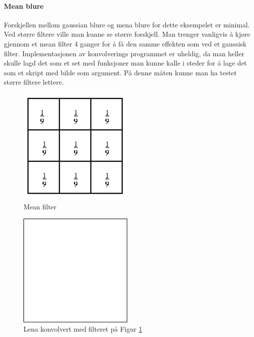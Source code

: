 \documentclass[a4paper, 12pt]{article}
\begin{document}
\paragraph{Mean blure}
Forskjellen mellom gaussian blure og mena blure for dette eksempelet er minimal. Ved større filtere ville man kunne se større forskjell. Man trenger vanligvis å kjøre gjennom et mean filter 4 ganger for å få den samme effekten som ved et gaussisk filter. Implementasjonen av konvolverings programmet er uheldig, da man heller skulle lagd det som et set med funksjoner man kunne kalle i steder for å lage det som et skript med bilde som argument. På denne måten kunne man ha testet større filtere lettere.

\begin{figure}[h]
  \centering
  \includegraphics[width=0.5\textwidth]{images/mean-filter}
  \caption{Mean filter}
  \label{fig:mean-blure}
\end{figure}

\begin{figure}[h]
  \centering
  \includegraphics[width=0.5\textwidth]{images/mean-blure-lena}
  \caption{Lena konvolvert med filteret på Figur \ref{fig:mean-blure}}
  \label{fig:mean-blurred-lena}
\end{figure}
\end{document}
